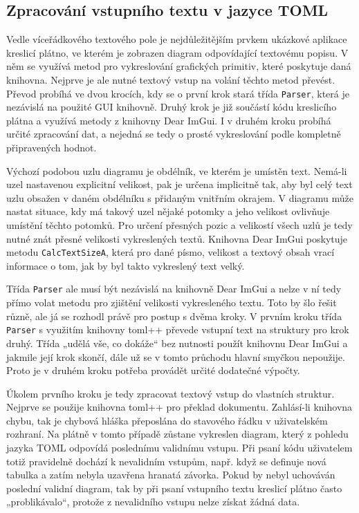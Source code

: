 \documentclass[FM,DP]{tulthesis}
\begin{document}
	\subsection{Zpracování vstupního textu v jazyce TOML}
	
	Vedle víceřádkového textového pole je nejdůležitějším prvkem ukázkové aplikace kreslicí plátno, ve kterém je zobrazen diagram odpovídající textovému popisu. V něm se využívá metod pro vykreslování grafických primitiv, které poskytuje daná knihovna. Nejprve je ale nutné textový vstup na volání těchto metod převést. Převod probíhá ve dvou krocích, kdy se o první krok stará třída \texttt{Parser}, která je nezávislá na použité GUI knihovně. Druhý krok je již součástí kódu kreslicího plátna a využívá metody z knihovny Dear ImGui. I v druhém kroku probíhá určité zpracování dat, a nejedná se tedy o prosté vykreslování podle kompletně připravených hodnot.
	
	Výchozí podobou uzlu diagramu je obdélník, ve kterém je umístěn text. Nemá-li uzel nastavenou explicitní velikost, pak je určena implicitně tak, aby byl celý text uzlu obsažen v daném obdélníku s přidaným vnitřním okrajem. V diagramu může nastat situace, kdy má takový uzel nějaké potomky a jeho velikost ovlivňuje umístění těchto potomků. Pro určení přesných pozic a velikostí všech uzlů je tedy nutné znát přesné velikosti vykreslených textů. Knihovna Dear ImGui poskytuje metodu \texttt{CalcTextSizeA}, která pro dané písmo, velikost a textový obsah vrací informace o tom, jak by byl takto vykreslený text velký.
	
	Třída \texttt{Parser} ale musí být nezávislá na knihovně Dear ImGui a nelze v ní tedy přímo volat metodu pro zjištění velikosti vykresleného textu. Toto by šlo řešit různě, ale já se rozhodl právě pro postup s dvěma kroky. V prvním kroku třída \texttt{Parser} s využitím knihovny toml++ převede vstupní text na struktury pro krok druhý. Třída „udělá vše, co dokáže“ bez nutnosti použít knihovnu Dear ImGui a jakmile její krok skončí, dále už se v tomto průchodu hlavní smyčkou nepoužije. Proto je v druhém kroku potřeba provádět určité dodatečné výpočty.
	
	Úkolem prvního kroku je tedy zpracovat textový vstup do vlastních struktur. Nejprve se použije knihovna toml++ pro překlad dokumentu. Zahlásí-li knihovna chybu, tak je chybová hláška přeposlána do stavového řádku v uživatelském rozhraní. Na plátně v tomto případě zůstane vykreslen diagram, který z pohledu jazyka TOML odpovídá poslednímu validnímu vstupu. Při psaní kódu uživatelem totiž pravidelně dochází k nevalidním vstupům, např. když se definuje nová tabulka a zatím nebyla uzavřena hranatá závorka. Pokud by nebyl uchováván poslední validní diagram, tak by při psaní vstupního textu kreslicí plátno často „problikávalo“, protože z nevalidního vstupu nelze získat žádná data.
	
\end{document}

